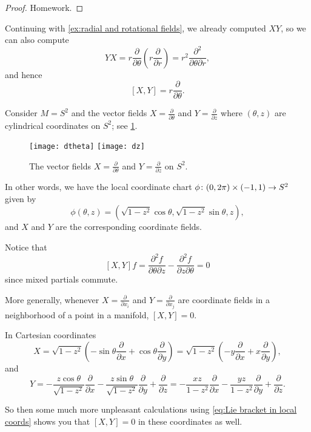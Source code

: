 \begin{proof}
	Homework.
\end{proof}

\begin{example}
	Continuing with \cref{ex:radial and rotational fields}, we already computed $XY$, so we can also compute 
	\[
		YX = r \frac{\partial}{\partial \theta} \left( r \frac{\partial}{\partial r}\right) = r^2 \frac{\partial^2}{\partial \theta \partial r},
	\]
	and hence
	\[
		[X,Y] = r \frac{\partial}{\partial \theta}.
	\]
\end{example}

\begin{example}
	Consider $M = S^2$ and the vector fields $X = \frac{\partial}{\partial \theta}$ and $Y = \frac{\partial}{\partial z}$ where $(\theta,z)$ are cylindrical coordinates on $S^2$; see \cref{fig:dtheta and dz}. 
	
	\begin{figure}[htbp]
		\centering
			\texttt{[image: dtheta]} \qquad \texttt{[image: dz]}
		\caption{The vector fields $X = \frac{\partial}{\partial \theta}$ and $Y = \frac{\partial}{\partial z}$ on $S^2$.}
		\label{fig:dtheta and dz}
	\end{figure}
	
	In other words, we have the local coordinate chart $\phi\colon\thinspace\! (0,2\pi) \times (-1,1) \to S^2$ given by
	\[
		\phi(\theta,z) = (\sqrt{1-z^2} \cos\theta, \sqrt{1-z^2} \sin \theta, z),
	\]
	and $X$ and $Y$ are the corresponding coordinate fields.
	
	Notice that
	\[
		[X,Y]f = \frac{\partial^2 f}{\partial \theta \partial z} - \frac{\partial^2 f}{\partial z \partial \theta} = 0
	\]
	since mixed partials commute.
	
	More generally, whenever $X = \frac{\partial}{\partial x_i}$ and $Y = \frac{\partial}{\partial x_j}$ are coordinate fields in a neighborhood of a point in a manifold, $[X,Y] = 0$.
	
	In Cartesian coordinates
	\[
		X = \sqrt{1-z^2}\left( - \sin \theta \frac{\partial}{\partial x} + \cos \theta \frac{\partial}{\partial y}\right) = \sqrt{1-z^2}\left( - y \frac{\partial}{\partial x} + x \frac{\partial}{\partial y}\right),
	\]
	and
	\[
		Y = -\frac{z \cos\theta}{\sqrt{1-z^2}}\frac{\partial}{\partial x} - \frac{z \sin\theta}{\sqrt{1-z^2}}\frac{\partial}{\partial y} + \frac{\partial}{\partial z} = -\frac{xz}{1-z^2}\frac{\partial}{\partial x} - \frac{yz}{1-z^2}\frac{\partial}{\partial y} + \frac{\partial}{\partial z}.
	\]
	
	So then some much more unpleasant calculations using \eqref{eq:Lie bracket in local coords} shows you that $[X,Y] = 0$ in these coordinates as well.
\end{example}

